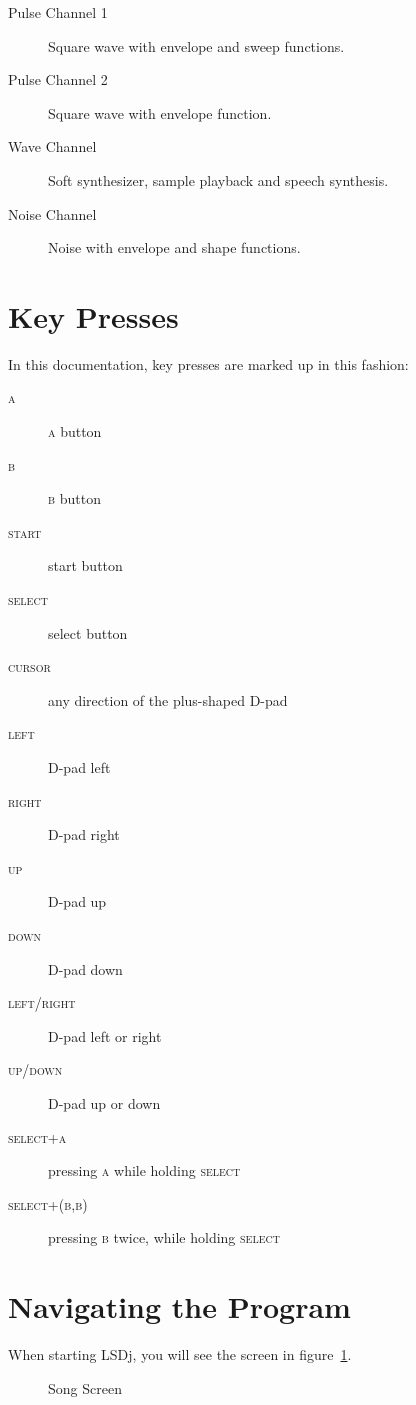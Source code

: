 \begin{description}
\item[Pulse Channel 1] Square wave with envelope and sweep functions.
\item[Pulse Channel 2] Square wave with envelope function.
\item[Wave Channel] Soft synthesizer, sample playback and speech synthesis.
\item[Noise Channel] Noise with envelope and shape functions.
\end{description}


\section{Key Presses}
In this documentation, key presses are marked up in this fashion:
\begin{description}
\item[\textsc{a}] \textsc{a} button
\item[\textsc{b}] \textsc{b} button
\item[\textsc{start}] start button
\item[\textsc{select}] select button
\item[\textsc{cursor}] any direction of the plus-shaped D-pad
\item[\textsc{left}] D-pad left
\item[\textsc{right}] D-pad right
\item[\textsc{up}] D-pad up
\item[\textsc{down}] D-pad down
\item[\textsc{left/right}] D-pad left or right
\item[\textsc{up/down}] D-pad up or down
\item[\textsc{select+a}] pressing \textsc{a} while holding \textsc{select}
\item[\textsc{select+(b,b)}] pressing \textsc{b} twice, while holding \textsc{select}
\end{description}

\section{Navigating the Program}
When starting LSDj, you will see the screen in figure~\ref{fig:song}.

\begin{figure}[hbtp]
\centering
{}
\caption{Song Screen}
\label{fig:song}
\end{figure}

